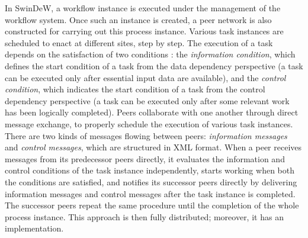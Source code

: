 In SwinDeW, a workflow instance is executed under the management of the workflow system. Once such an instance is created, a peer network is also constructed for carrying out this process instance. Various task instances are scheduled to enact at different sites, step by step. The execution of a task depends on the satisfaction of two conditions : the \textit{information condition}, which defines the start condition of a task from the data dependency
perspective (a task can be executed only after essential input data are available), and the \textit{control condition}, which indicates the start condition of a task from the control dependency perspective (a task can be executed only after some relevant work has been logically completed). Peers collaborate with one another through direct message exchange, to properly schedule the execution of various task instances. There are two kinds of messages flowing between peers: \textit{information messages} and \textit{control messages}, which are structured in XML format. When a peer receives messages from its predecessor peers directly, it evaluates the information and control conditions of the task instance independently, starts working when both the conditions are satisfied, and notifies its successor peers directly by delivering information messages and control messages after the task instance is completed. The successor peers repeat the same procedure until the completion of the whole process instance. This approach is then fully distributed; moreover, it has an implementation.

